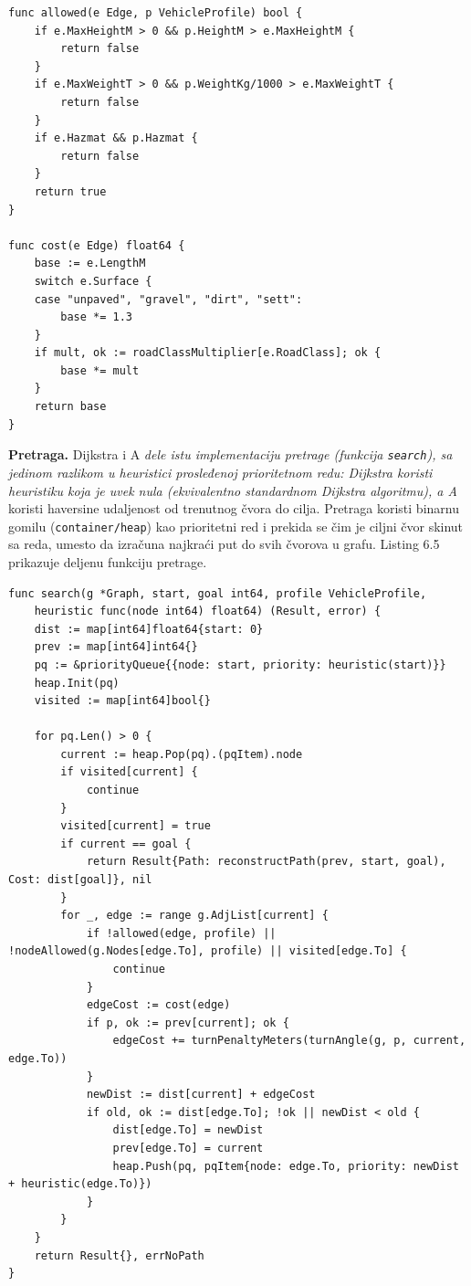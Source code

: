 \begin{lstlisting}[caption={[Isključivanje nedopustivih ivica i funkcija cene]Isključivanje nedopustivih ivica i funkcija cene (\texttt{backend/internal/algorithm/cost.go})}]
func allowed(e Edge, p VehicleProfile) bool {
	if e.MaxHeightM > 0 && p.HeightM > e.MaxHeightM {
		return false
	}
	if e.MaxWeightT > 0 && p.WeightKg/1000 > e.MaxWeightT {
		return false
	}
	if e.Hazmat && p.Hazmat {
		return false
	}
	return true
}

func cost(e Edge) float64 {
	base := e.LengthM
	switch e.Surface {
	case "unpaved", "gravel", "dirt", "sett":
		base *= 1.3
	}
	if mult, ok := roadClassMultiplier[e.RoadClass]; ok {
		base *= mult
	}
	return base
}
\end{lstlisting}

\textbf{Pretraga.} Dijkstra i A\emph{ dele istu implementaciju pretrage (funkcija \texttt{search}), sa jedinom razlikom u heuristici prosleđenoj prioritetnom redu: Dijkstra koristi heuristiku koja je uvek nula (ekvivalentno standardnom Dijkstra algoritmu), a A} koristi haversine udaljenost od trenutnog čvora do cilja. Pretraga koristi binarnu gomilu (\texttt{container/heap}) kao prioritetni red i prekida se čim je ciljni čvor skinut sa reda, umesto da izračuna najkraći put do svih čvorova u grafu. Listing 6.5 prikazuje deljenu funkciju pretrage.

\begin{lstlisting}[caption={[Deljena implementacija Dijkstra i A* pretrage]Deljena implementacija Dijkstra i A* pretrage (\texttt{backend/internal/algorithm/dijkstra.go})}]
func search(g *Graph, start, goal int64, profile VehicleProfile,
	heuristic func(node int64) float64) (Result, error) {
	dist := map[int64]float64{start: 0}
	prev := map[int64]int64{}
	pq := &priorityQueue{{node: start, priority: heuristic(start)}}
	heap.Init(pq)
	visited := map[int64]bool{}

	for pq.Len() > 0 {
		current := heap.Pop(pq).(pqItem).node
		if visited[current] {
			continue
		}
		visited[current] = true
		if current == goal {
			return Result{Path: reconstructPath(prev, start, goal), Cost: dist[goal]}, nil
		}
		for _, edge := range g.AdjList[current] {
			if !allowed(edge, profile) || !nodeAllowed(g.Nodes[edge.To], profile) || visited[edge.To] {
				continue
			}
			edgeCost := cost(edge)
			if p, ok := prev[current]; ok {
				edgeCost += turnPenaltyMeters(turnAngle(g, p, current, edge.To))
			}
			newDist := dist[current] + edgeCost
			if old, ok := dist[edge.To]; !ok || newDist < old {
				dist[edge.To] = newDist
				prev[edge.To] = current
				heap.Push(pq, pqItem{node: edge.To, priority: newDist + heuristic(edge.To)})
			}
		}
	}
	return Result{}, errNoPath
}
\end{lstlisting}

